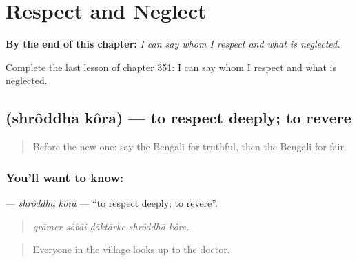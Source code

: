 
\chapter{Respect and Neglect}
\label{ch:bn-respect-and-neglect}

\begin{chapteropening}
\textbf{By the end of this chapter:} \emph{I can say whom I respect and what is neglected.}

Complete the last lesson of chapter 351: I can say whom I respect and what is neglected.
\end{chapteropening}

\section[\texorpdfstring{\bn{শ্রদ্ধা} \bn{করা} (shrôddhā kôrā)}{শ্রদ্ধা করা (shrôddhā kôrā)}]{  (shrôddhā kôrā) — to respect deeply; to revere}

\label{lesson:BN-C351-shroddha-kora}



\begin{quote}
Before the new one: say the Bengali for truthful, then the Bengali for fair.
\end{quote}

\subsection*{You'll want to know:  }
\textbf{ } — \emph{shrôddhā kôrā} — \textquotedblleft{}to respect deeply; to revere\textquotedblright{}.

\begin{quote}
    
\end{quote}

\begin{quote}
\emph{grāmer sôbāi ḍāktārke shrôddhā kôre.}
\end{quote}

\begin{quote}
Everyone in the village looks up to the doctor.
\end{quote}

